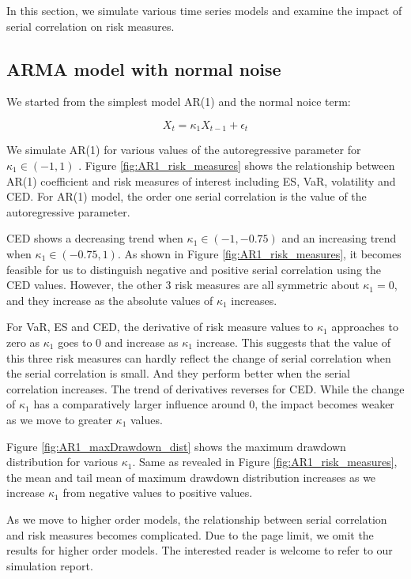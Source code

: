 \documentclass[11pt]{article}
\begin{document}
In this section, we simulate various time series models and examine the impact of serial correlation on risk measures.

\subsection{ARMA model with normal noise}

We started from the simplest model AR(1) and the normal noice term:

\begin{equation}
X_t = \kappa_1X_{t-1} + \epsilon_t
\end{equation}

We simulate AR(1) for various values of the autoregressive parameter for $\kappa_1 \in (-1, 1)$ . Figure \ref{fig:AR1_risk_measures} shows the relationship between AR(1) coefficient and risk measures of interest including ES, VaR, volatility and CED. For AR(1) model, the order one serial correlation is the value of the autoregressive parameter.

CED shows a decreasing trend when $\kappa_1\in(-1, -0.75)$ and an increasing trend when $\kappa_1 \in(-0.75, 1)$. As shown in Figure \ref{fig:AR1_risk_measures}, it becomes feasible for us to distinguish negative and positive serial correlation using the CED values. However, the other 3 risk measures are all symmetric about $\kappa_1 = 0$, and they increase as the absolute values of $\kappa_1$ increases.

For VaR, ES and CED, the derivative of risk measure values to $\kappa_1$ approaches to zero as  $\kappa_1$ goes to 0 and increase as $\kappa_1$ increase. This suggests that the value of this three risk measures can hardly reflect the change of serial correlation when the serial correlation is small. And they perform better when the serial correlation increases. The trend of derivatives reverses for CED. While the change of $\kappa_1$ has a comparatively larger influence around 0, the impact becomes weaker as we move to greater $\kappa_1$ values.

Figure \ref{fig:AR1_maxDrawdown_dist} shows the maximum drawdown distribution for various $\kappa_1$. Same as revealed in Figure \ref{fig:AR1_risk_measures}, the mean and tail mean of maximum drawdown distribution increases as we increase $\kappa_1$ from negative values to positive values.

As we move to higher order models, the relationship between serial correlation and risk measures becomes complicated. Due to the page limit, we omit the results for higher order models. The interested reader is welcome to refer to our simulation report.
\end{document}
